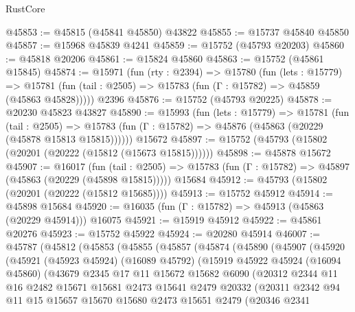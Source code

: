 \begin{lexlean}{RustCore}
\begin{coremodule}
@45853 := @45815 (@45841 @45850) @43822
@45855 := @15737 @45840 @45850
@45857 := @15968 @45839 @4241
@45859 := @15752 (@45793 @20203)
@45860 := @45818 @20206
@45861 := @15824 @45860
@45863 := @15752 (@45861 @15845)
@45874 := @15971
    (fun (rty : @2394) =>
    @15780
      (fun (lets : @15779) =>
      @15781 (fun (tail : @2505) => @15783 (fun (Γ : @15782) => @45859 (@45863 @45828)))))
    @2396
@45876 := @15752 (@45793 @20225)
@45878 := @20230 @45823 @43827
@45890 := @15993
    (fun (lets : @15779) =>
    @15781
      (fun (tail : @2505) =>
      @15783 (fun (Γ : @15782) => @45876 (@45863 (@20229 (@45878 @15813 @15815))))))
    @15672
@45897 := @15752 (@45793 (@15802 (@20201 (@20222 (@15812 (@15673 @15815))))))
@45898 := @45878 @15672
@45907 := @16017
    (fun (tail : @2505) => @15783 (fun (Γ : @15782) => @45897 (@45863 (@20229 (@45898 @15815)))))
    @15684
@45912 := @45793 (@15802 (@20201 (@20222 (@15812 @15685))))
@45913 := @15752 @45912
@45914 := @45898 @15684
@45920 := @16035 (fun (Γ : @15782) => @45913 (@45863 (@20229 @45914))) @16075
@45921 := @15919 @45912
@45922 := @45861 @20276
@45923 := @15752 @45922
@45924 := @20280 @45914
@46007 := @45787
    (@45812
      (@45853
        (@45855
          (@45857
            (@45874
              (@45890
                (@45907
                  (@45920
                    (@45921
                      (@45923 @45924)
                      (@16089 @45792)
                      (@15919
                        @45922
                        @45924
                        (@16094 @45860)
                        (@43679
                          @2345
                          @17
                          @11
                          @15672
                          @15682
                          @6090
                          (@20312
                            @2344
                            @11
                            @16
                            @2482
                            @15671
                            @15681
                            @2473
                            @15641
                            @2479
                            @20332
                            (@20311
                              @2342
                              @94
                              @11
                              @15
                              @15657
                              @15670
                              @15680
                              @2473
                              @15651
                              @2479
                              (@20346
                                @2341

\end{coremodule}
\end{lexlean}

